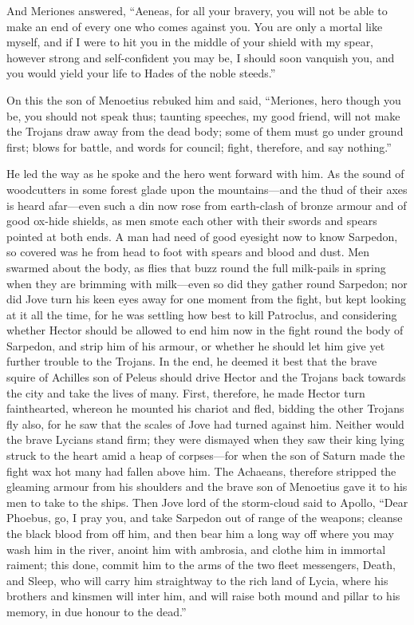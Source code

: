 And Meriones answered, “Aeneas, for all your bravery, you will not be able
to make an end of every one who comes against you. You are only a mortal
like myself, and if I were to hit you in the middle of your shield with my
spear, however strong and self-confident you may be, I should soon
vanquish you, and you would yield your life to Hades of the noble steeds.”

On this the son of Menoetius rebuked him and said, “Meriones, hero though
you be, you should not speak thus; taunting speeches, my good friend, will
not make the Trojans draw away from the dead body; some of them must go
under ground first; blows for battle, and words for council; fight,
therefore, and say nothing.”

He led the way as he spoke and the hero went forward with him. As the
sound of woodcutters in some forest glade upon the mountains—and the
thud of their axes is heard afar—even such a din now rose from
earth-clash of bronze armour and of good ox-hide shields, as men smote
each other with their swords and spears pointed at both ends. A man had
need of good eyesight now to know Sarpedon, so covered was he from head to
foot with spears and blood and dust. Men swarmed about the body, as flies
that buzz round the full milk-pails in spring when they are brimming with
milk—even so did they gather round Sarpedon; nor did Jove turn his
keen eyes away for one moment from the fight, but kept looking at it all
the time, for he was settling how best to kill Patroclus, and considering
whether Hector should be allowed to end him now in the fight round the
body of Sarpedon, and strip him of his armour, or whether he should let
him give yet further trouble to the Trojans. In the end, he deemed it best
that the brave squire of Achilles son of Peleus should drive Hector and
the Trojans back towards the city and take the lives of many. First,
therefore, he made Hector turn fainthearted, whereon he mounted his
chariot and fled, bidding the other Trojans fly also, for he saw that the
scales of Jove had turned against him. Neither would the brave Lycians
stand firm; they were dismayed when they saw their king lying struck to
the heart amid a heap of corpses—for when the son of Saturn made the
fight wax hot many had fallen above him. The Achaeans, therefore stripped
the gleaming armour from his shoulders and the brave son of Menoetius gave
it to his men to take to the ships. Then Jove lord of the storm-cloud said
to Apollo, “Dear Phoebus, go, I pray you, and take Sarpedon out of range
of the weapons; cleanse the black blood from off him, and then bear him a
long way off where you may wash him in the river, anoint him with
ambrosia, and clothe him in immortal raiment; this done, commit him to the
arms of the two fleet messengers, Death, and Sleep, who will carry him
straightway to the rich land of Lycia, where his brothers and kinsmen will
inter him, and will raise both mound and pillar to his memory, in due
honour to the dead.”

